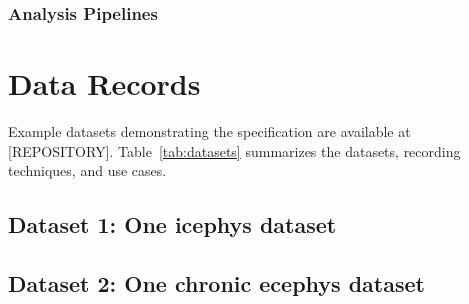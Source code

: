 \documentclass[fleqn,10pt]{wlscirep}
\begin{document}
\subsubsection*{Analysis Pipelines}


\section*{Data Records}




Example datasets demonstrating the specification are available at [REPOSITORY].
Table~\ref{tab:datasets} summarizes the datasets, recording techniques, and use cases.


\subsection*{Dataset 1: One icephys dataset}

\subsection*{Dataset 2: One chronic ecephys dataset}
\end{document}
